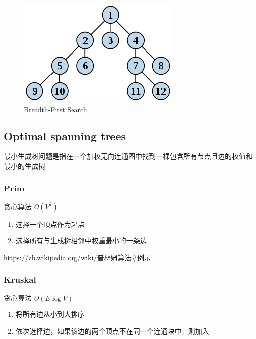 \documentclass[11pt,journal,compsoc]{IEEEtran}
\begin{document}
\begin{figure}
    \centering
    \includegraphics[width=\linewidth]{BFS.png}
    \caption{Breadth-First Search}
\end{figure}


\subsection{Optimal spanning trees}

最小生成树问题是指在一个加权无向连通图中找到一棵包含所有节点且边的权值和最小的生成树


\subsubsection{Prim}

贪心算法 $O(V^2)$

\begin{enumerate}
    \item 选择一个顶点作为起点

    \item 选择所有与生成树相邻中权重最小的一条边
\end{enumerate}

\url{https://zh.wikipedia.org/wiki/普林姆算法#例示}


\subsubsection{Kruskal}

贪心算法 $O(E \log V)$

\begin{enumerate}
    \item 将所有边从小到大排序

    \item 依次选择边，如果该边的两个顶点不在同一个连通块中，则加入
\end{enumerate}
\end{document}

